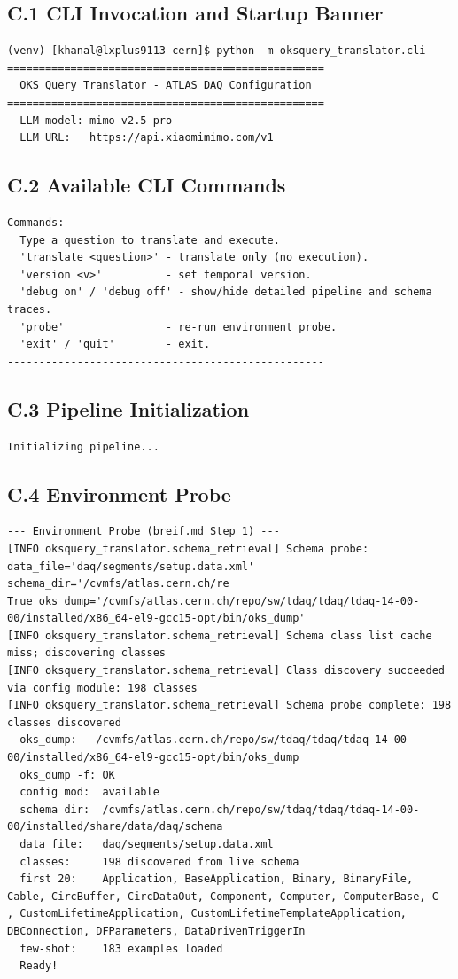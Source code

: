 \documentclass[12pt, a4paper]{report}
\begin{document}
\subsection*{C.1 CLI Invocation and Startup Banner}
\begin{lstlisting}
(venv) [khanal@lxplus9113 cern]$ python -m oksquery_translator.cli
==================================================
  OKS Query Translator - ATLAS DAQ Configuration
==================================================
  LLM model: mimo-v2.5-pro
  LLM URL:   https://api.xiaomimimo.com/v1
\end{lstlisting}

\subsection*{C.2 Available CLI Commands}
\begin{lstlisting}
Commands:
  Type a question to translate and execute.
  'translate <question>' - translate only (no execution).
  'version <v>'          - set temporal version.
  'debug on' / 'debug off' - show/hide detailed pipeline and schema traces.
  'probe'                - re-run environment probe.
  'exit' / 'quit'        - exit.
--------------------------------------------------
\end{lstlisting}

\subsection*{C.3 Pipeline Initialization}
\begin{lstlisting}
Initializing pipeline...
\end{lstlisting}

\subsection*{C.4 Environment Probe}
\begin{lstlisting}
--- Environment Probe (breif.md Step 1) ---
[INFO oksquery_translator.schema_retrieval] Schema probe: data_file='daq/segments/setup.data.xml' schema_dir='/cvmfs/atlas.cern.ch/re
True oks_dump='/cvmfs/atlas.cern.ch/repo/sw/tdaq/tdaq/tdaq-14-00-00/installed/x86_64-el9-gcc15-opt/bin/oks_dump'
[INFO oksquery_translator.schema_retrieval] Schema class list cache miss; discovering classes
[INFO oksquery_translator.schema_retrieval] Class discovery succeeded via config module: 198 classes
[INFO oksquery_translator.schema_retrieval] Schema probe complete: 198 classes discovered
  oks_dump:   /cvmfs/atlas.cern.ch/repo/sw/tdaq/tdaq/tdaq-14-00-00/installed/x86_64-el9-gcc15-opt/bin/oks_dump
  oks_dump -f: OK
  config mod:  available
  schema dir:  /cvmfs/atlas.cern.ch/repo/sw/tdaq/tdaq/tdaq-14-00-00/installed/share/data/daq/schema
  data file:   daq/segments/setup.data.xml
  classes:     198 discovered from live schema
  first 20:    Application, BaseApplication, Binary, BinaryFile, Cable, CircBuffer, CircDataOut, Component, Computer, ComputerBase, C
, CustomLifetimeApplication, CustomLifetimeTemplateApplication, DBConnection, DFParameters, DataDrivenTriggerIn
  few-shot:    183 examples loaded
  Ready!
\end{lstlisting}
\end{document}
